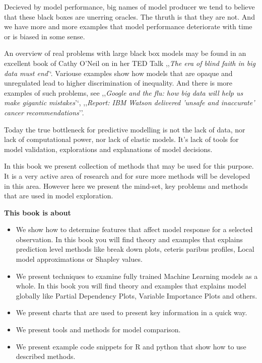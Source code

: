\documentclass[]{krantz}
\providecommand{\tightlist}{%
  \setlength{\itemsep}{0pt}\setlength{\parskip}{0pt}}
\theoremstyle{definition}
\theoremstyle{definition}
\theoremstyle{definition}
\theoremstyle{remark}
\begin{document}
Decieved by model performance, big names of model producer we tend to
believe that these black boxes are unerring oracles. The thruth is that
they are not. And we have more and more examples that model performance
deteriorate with time or is biased in some sense.

An overview of real problems with large black box models may be found in
an excellent book of Cathy O'Neil \citep{ONeil} on in her TED Talk
,,\emph{The era of blind faith in big data must end}'`. Variouse
examples show how models that are opaque and unregulated lead to higher
discrimination of inequality. And there is more examples of such
problems, see ,,\emph{Google and the flu: how big data will help us make
gigantic mistakes}'`, ,,\emph{Report: IBM Watson delivered 'unsafe and
inaccurate' cancer recommendations}''.

Today the true bottleneck for predictive modelling is not the lack of
data, nor lack of computational power, nor lack of elastic models. It's
lack of tools for model validation, explorations and explanations of
model decisions.

In this book we present collection of methods that may be used for this
purpose. It is a very active area of research and for sure more methods
will be developed in this area. However here we present the mind-set,
key problems and methods that are used in model exploration.

\textbf{This book is about}

\begin{itemize}
\tightlist
\item
  We show how to determine features that affect model response for a
  selected observation. In this book you will find theory and examples
  that explains prediction level methods like break down plots, ceteris
  paribus profiles, Local model approximations or Shapley values.
\item
  We present techniques to examine fully trained Machine Learning models
  as a whole. In this book you will find theory and examples that
  explains model globally like Partial Dependency Plots, Variable
  Importance Plots and others.
\item
  We present charts that are used to present key information in a quick
  way.
\item
  We present tools and methods for model comparison.
\item
  We present example code snippets for R and python that show how to use
  described methods.
\end{itemize}
\end{document}
